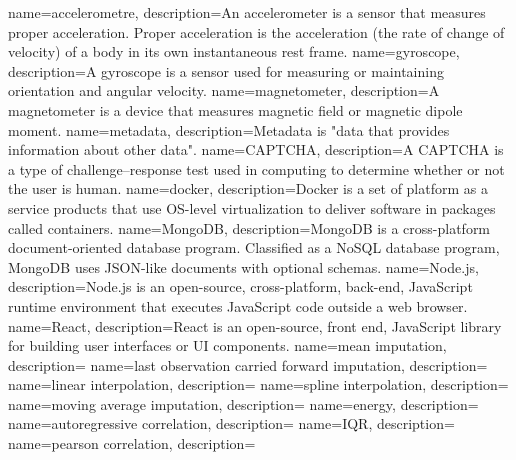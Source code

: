 {
    name={accelerometre},
    description={An accelerometer is a sensor that measures proper acceleration. Proper acceleration is the acceleration (the rate of change of velocity) of a body in its own instantaneous rest frame.
    }
}
{
    name={gyroscope},
    description={A gyroscope is a sensor used for measuring or maintaining orientation and angular velocity. 
    }
}
{
    name={magnetometer},
    description={A magnetometer is a device that measures magnetic field or magnetic dipole moment.}
}
{
    name={metadata},
    description={Metadata is "data that provides information about other data".}
}
{
    name={CAPTCHA},
    description={A CAPTCHA is a type of challenge–response test used in computing to determine whether or not the user is human.}
}
{
    name={docker},
    description={Docker is a set of platform as a service products that use OS-level virtualization to deliver software in packages called containers.}
}
{
    name={MongoDB},
    description={MongoDB is a cross-platform document-oriented database program. Classified as a NoSQL database program, MongoDB uses JSON-like documents with optional schemas.}
}
{
    name={Node.js},
    description={Node.js is an open-source, cross-platform, back-end, JavaScript runtime environment that executes JavaScript code outside a web browser.}
}
{
    name={React},
    description={React is an open-source, front end, JavaScript library for building user interfaces or UI components.}
}
{
    name={mean imputation},
    description={}
}
{
    name={last observation carried forward imputation},
    description={}
}
{
    name={linear interpolation},
    description={}
}
{
    name={spline interpolation},
    description={}
}
{
    name={moving average imputation},
    description={}
}
{
    name={energy},
    description={}
}
{
    name={autoregressive correlation},
    description={}
}
{
    name={IQR},
    description={}
}
{
    name={pearson correlation},
    description={}
}
